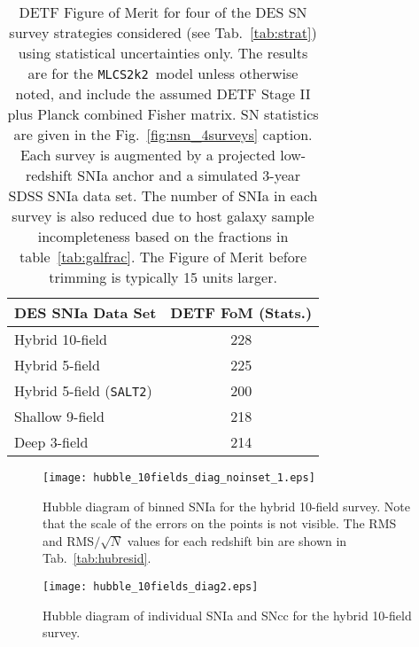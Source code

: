 \documentclass[preprint2]{aastex}    %
\newcommand{\mlcs}{{\tt MLCS2k2}}
\newcommand{\salt}{{\tt SALT2}}
\begin{document}
\begin{table}[ht]
\centering%
\begin{tabular}
[c]{|l|c|}\hline
DES SNIa Data Set & DETF FoM (Stats.)\\
\hline
Hybrid 10-field & 228\\
Hybrid 5-field  & 225 \\
Hybrid 5-field (\salt) & 200 \\
Shallow 9-field & 218\\
Deep 3-field & 214 \\
\hline
\end{tabular}
\caption{DETF Figure of Merit for four of the 
DES SN survey strategies considered (see Tab.~\ref{tab:strat}) using statistical
uncertainties only. The results are for the \mlcs\ model unless otherwise noted,
and include the assumed DETF Stage II plus Planck combined Fisher matrix.
SN statistics are given in the 
Fig.~\ref{fig:nsn_4surveys} caption. 
Each survey is augmented by a projected low-redshift SNIa anchor and a simulated 
3-year SDSS SNIa data set. The number of SNIa in 
each survey is also reduced due to host galaxy sample incompleteness 
based on the fractions in table~\ref{tab:galfrac}.
The Figure of Merit before trimming is typically 15 units 
larger.}
\label{tab:fomstat}%
\end{table}

\onecolumn
\begin{figure}[ht]
\centerline{\texttt{[image: hubble\_10fields\_diag\_noinset\_1.eps]}}
\caption{Hubble diagram of binned SNIa for the hybrid 10-field survey. Note that the scale of the 
errors on the points is not visible. The RMS and RMS$/\sqrt{N}$ values for each redshift bin are 
shown in Tab.~\ref{tab:hubresid}.}
\label{fig:hubble_diag1}
\end{figure}

\begin{figure}[ht]
\centerline{\texttt{[image: hubble\_10fields\_diag2.eps]}}
\caption{Hubble diagram of individual SNIa and SNcc for the hybrid 10-field survey.}
\label{fig:hubble_diag2}
\end{figure}
\twocolumn
\end{document}
